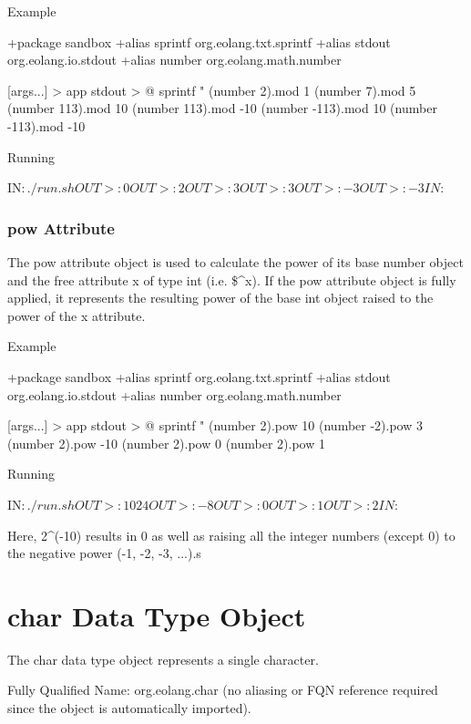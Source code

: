 \documentclass[12pt]{book}
\begin{document}
Example
\begin{ffcode}
+package sandbox
+alias sprintf org.eolang.txt.sprintf
+alias stdout org.eolang.io.stdout
+alias number org.eolang.math.number

[args...] > app
  stdout > @
    sprintf
      "%
      (number 2).mod 1
      (number 7).mod 5
      (number 113).mod 10
      (number 113).mod -10
      (number -113).mod 10
      (number -113).mod -10

Running

IN$: ./run.sh
OUT>: 0
OUT>: 2
OUT>: 3
OUT>: 3
OUT>: -3
OUT>: -3
IN$: 
\end{ffcode}

\subsubsection{pow Attribute}
The pow attribute object is used to calculate the power of its base number object and the free attribute x of type int (i.e. \$\textasciicircum x).
If the pow attribute object is fully applied, it represents the resulting power of the base int object raised to the power of the x attribute.

Example
\begin{ffcode}
+package sandbox
+alias sprintf org.eolang.txt.sprintf
+alias stdout org.eolang.io.stdout
+alias number org.eolang.math.number

[args...] > app
  stdout > @
    sprintf
      "%
      (number 2).pow 10
      (number -2).pow 3
      (number 2).pow -10
      (number 2).pow 0
      (number 2).pow 1

Running

IN$: ./run.sh
OUT>: 1024
OUT>: -8
OUT>: 0
OUT>: 1
OUT>: 2
IN$: 
\end{ffcode}
Here, 2\textasciicircum(-10) results in 0 as well as raising all the integer numbers (except 0) to the negative power (-1, -2, -3, ...).s

\section{char Data Type Object}
\noindent{}


The char data type object represents a single character.

Fully Qualified Name: org.eolang.char (no aliasing or FQN reference required since the object is automatically imported).
\end{document}
